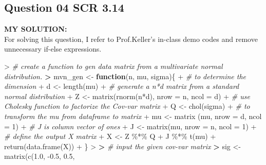 \documentclass[
]{article}
\newenvironment{Shaded}{\begin{snugshade}}{\end{snugshade}}
\newcommand{\AttributeTok}[1]{\textcolor[rgb]{0.77,0.63,0.00}{#1}}
\newcommand{\CommentTok}[1]{\textcolor[rgb]{0.56,0.35,0.01}{\textit{#1}}}
\newcommand{\ControlFlowTok}[1]{\textcolor[rgb]{0.13,0.29,0.53}{\textbf{#1}}}
\newcommand{\DecValTok}[1]{\textcolor[rgb]{0.00,0.00,0.81}{#1}}
\newcommand{\ErrorTok}[1]{\textcolor[rgb]{0.64,0.00,0.00}{\textbf{#1}}}
\newcommand{\FloatTok}[1]{\textcolor[rgb]{0.00,0.00,0.81}{#1}}
\newcommand{\FunctionTok}[1]{\textcolor[rgb]{0.00,0.00,0.00}{#1}}
\newcommand{\NormalTok}[1]{#1}
\newcommand{\OtherTok}[1]{\textcolor[rgb]{0.56,0.35,0.01}{#1}}
\newcommand{\SpecialCharTok}[1]{\textcolor[rgb]{0.00,0.00,0.00}{#1}}
\begin{document}
\hypertarget{question-04-scr-3.14}{%
\subsection{Question 04 SCR 3.14}\label{question-04-scr-3.14}}

\textbf{MY SOLUTION:}\\
For solving this question, I refer to Prof.Keller's in-class demo codes
and remove unnecessary if-else expressions.

\begin{Shaded}
\begin{Highlighting}[]
\SpecialCharTok{\textgreater{}} \CommentTok{\# create a function to gen data matrix from a multivariate normal distribution.}
\ErrorTok{\textgreater{}}\NormalTok{ mvn\_gen }\OtherTok{\textless{}{-}} \ControlFlowTok{function}\NormalTok{(n, mu, sigma)\{}
\SpecialCharTok{+}   \CommentTok{\# to determine the dimension}
\SpecialCharTok{+}\NormalTok{   d }\OtherTok{\textless{}{-}} \FunctionTok{length}\NormalTok{(mu)}
\SpecialCharTok{+}   \CommentTok{\# generate a n*d matrix from a standard normal distribution}
\SpecialCharTok{+}\NormalTok{   Z }\OtherTok{\textless{}{-}} \FunctionTok{matrix}\NormalTok{(}\FunctionTok{rnorm}\NormalTok{(n}\SpecialCharTok{*}\NormalTok{d), }\AttributeTok{nrow =}\NormalTok{ n, }\AttributeTok{ncol =}\NormalTok{ d)}
\SpecialCharTok{+}   \CommentTok{\# use Cholesky function to factorize the Cov{-}var matrix}
\SpecialCharTok{+}\NormalTok{   Q }\OtherTok{\textless{}{-}} \FunctionTok{chol}\NormalTok{(sigma)}
\SpecialCharTok{+}   \CommentTok{\# to transform the mu from dataframe to matrix}
\SpecialCharTok{+}\NormalTok{   mu }\OtherTok{\textless{}{-}} \FunctionTok{matrix}\NormalTok{ (mu, }\AttributeTok{nrow =}\NormalTok{ d, }\AttributeTok{ncol =} \DecValTok{1}\NormalTok{)}
\SpecialCharTok{+}   \CommentTok{\# J is column vector of ones}
\SpecialCharTok{+}\NormalTok{   J }\OtherTok{\textless{}{-}} \FunctionTok{matrix}\NormalTok{(mu, }\AttributeTok{nrow =}\NormalTok{ n, }\AttributeTok{ncol =} \DecValTok{1}\NormalTok{)}
\SpecialCharTok{+}   \CommentTok{\# define the output X matrix}
\SpecialCharTok{+}\NormalTok{   X }\OtherTok{\textless{}{-}}\NormalTok{ Z }\SpecialCharTok{\%*\%}\NormalTok{ Q }\SpecialCharTok{+}\NormalTok{ J }\SpecialCharTok{\%*\%} \FunctionTok{t}\NormalTok{(mu)}
\SpecialCharTok{+}   \FunctionTok{return}\NormalTok{(}\FunctionTok{data.frame}\NormalTok{(X))}
\SpecialCharTok{+}\NormalTok{ \}}
\SpecialCharTok{\textgreater{}} 
\ErrorTok{\textgreater{}} \CommentTok{\# input the given cov{-}var matrix}
\ErrorTok{\textgreater{}}\NormalTok{ sig }\OtherTok{\textless{}{-}} \FunctionTok{matrix}\NormalTok{(}\FunctionTok{c}\NormalTok{(}\FloatTok{1.0}\NormalTok{, }\SpecialCharTok{{-}}\FloatTok{0.5}\NormalTok{, }\FloatTok{0.5}\NormalTok{,}

\end{Highlighting}
\end{Shaded}
\end{document}
